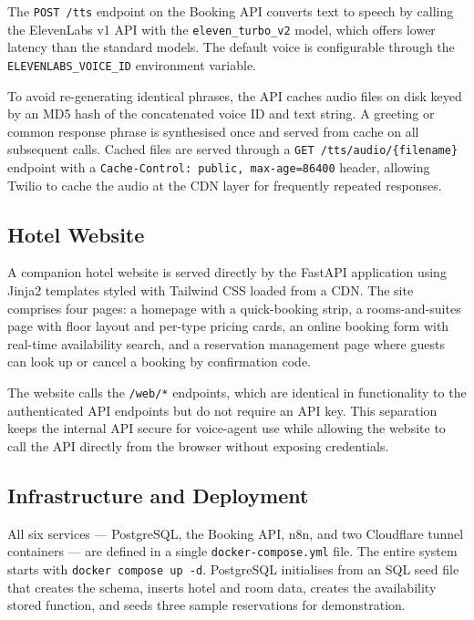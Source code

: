 \documentclass[conference]{IEEEtran}
\begin{document}
The \texttt{POST /tts} endpoint on the Booking API converts text to speech by
calling the ElevenLabs v1 API with the \texttt{eleven\_turbo\_v2} model, which
offers lower latency than the standard models. The default voice is configurable
through the \texttt{ELEVENLABS\_VOICE\_ID} environment variable.

To avoid re-generating identical phrases, the API caches audio files on disk
keyed by an MD5 hash of the concatenated voice ID and text string. A greeting
or common response phrase is synthesised once and served from cache on all
subsequent calls. Cached files are served through a \texttt{GET
/tts/audio/\{filename\}} endpoint with a \texttt{Cache-Control: public,
max-age=86400} header, allowing Twilio to cache the audio at the CDN layer
for frequently repeated responses.

\subsection{Hotel Website}

A companion hotel website is served directly by the FastAPI application using
Jinja2 templates styled with Tailwind CSS loaded from a CDN. The site
comprises four pages: a homepage with a quick-booking strip, a rooms-and-suites
page with floor layout and per-type pricing cards, an online booking form with
real-time availability search, and a reservation management page where guests
can look up or cancel a booking by confirmation code.

The website calls the \texttt{/web/*} endpoints, which are identical in
functionality to the authenticated API endpoints but do not require an API key.
This separation keeps the internal API secure for voice-agent use while
allowing the website to call the API directly from the browser without
exposing credentials.

\subsection{Infrastructure and Deployment}

All six services — PostgreSQL, the Booking API, n8n, and two Cloudflare
tunnel containers — are defined in a single \texttt{docker-compose.yml} file.
The entire system starts with \texttt{docker compose up -d}. PostgreSQL
initialises from an SQL seed file that creates the schema, inserts hotel and
room data, creates the availability stored function, and seeds three sample
reservations for demonstration.
\end{document}
